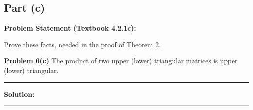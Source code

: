 \clearpage
\subsection*{Part (c)}

\textbf{Problem Statement (Textbook 4.2.1c):} 

Prove these facts, needed in the proof of Theorem 2.

\textbf{Problem 6(c)} The product of two upper (lower) triangular matrices is upper (lower) triangular.

\noindent\rule{\textwidth}{0.4pt}

\vspace{1em}

\textbf{Solution:}


\vspace{2em}
\noindent\rule{\textwidth}{0.4pt}
